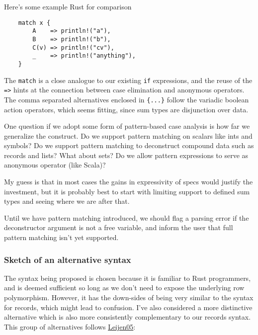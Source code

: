 \documentclass[11pt]{article}
\begin{document}
Here's some example Rust for comparison

\begin{verbatim}
    match x {
        A    => println!("a"),
        B    => println!("b"),
        C(v) => println!("cv"),
        _    => println!("anything"),
    }
\end{verbatim}

The \texttt{match} is a close analogue to our existing \texttt{if} expressions, and
the reuse of the \texttt{=>} hints at the connection between case elimination
and anonymous operators. The comma separated alternatives enclosed in
\texttt{\{...\}} follow the variadic boolean action operators, which seems
fitting, since sum types are disjunction over data.

One question if we adopt some form of pattern-based case analysis is how far we
generalize the construct. Do we support pattern matching on scalars like ints
and symbols? Do we support pattern matching to deconstruct compound data such as
records and lists? What about sets? Do we allow pattern expressions to serve as
anonymous operator (like Scala)?

My guess is that in most cases the gains in expressivity of specs would justify
the investment, but it is probably best to start with limiting support to
defined sum types and seeing where we are after that.

Until we have pattern matching introduced, we should flag a parsing error if the
deconstructor argument is not a free variable, and inform the user that full pattern
matching isn't yet supported.

\subsubsection{Sketch of an alternative syntax}
\label{sec:org8e41ae9}
The syntax being proposed is chosen because it is familiar to Rust programmers,
and is deemed sufficient so long as we don't need to expose the underlying row
polymorphism. However, it has the down-sides of being very similar to the syntax
for records, which might lead to confusion. I've also considered a more distinctive alternative which
is also more consistently complementary to our records syntax. This group of alternatives follows \href{https://www.microsoft.com/en-us/research/publication/extensible-records-with-scoped-labels/}{Leijen05}:
\end{document}
